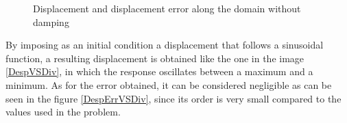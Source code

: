 \documentclass{ws-m3as}
\begin{document}

\begin{figure}
 \centering
  \caption{Displacement and displacement error along the domain without damping}
 \label{DespVSDiv2}
\end{figure}



By imposing as an initial condition a displacement that follows a sinusoidal function, a resulting displacement is obtained like the one in the image \ref{DespVSDiv}, in which the response oscillates between a maximum and a minimum. As for the error obtained, it can be considered negligible as can be seen in the figure \ref{DespErrVSDiv}, since its order is very small compared to the values used in the problem.\\

\end{document}
